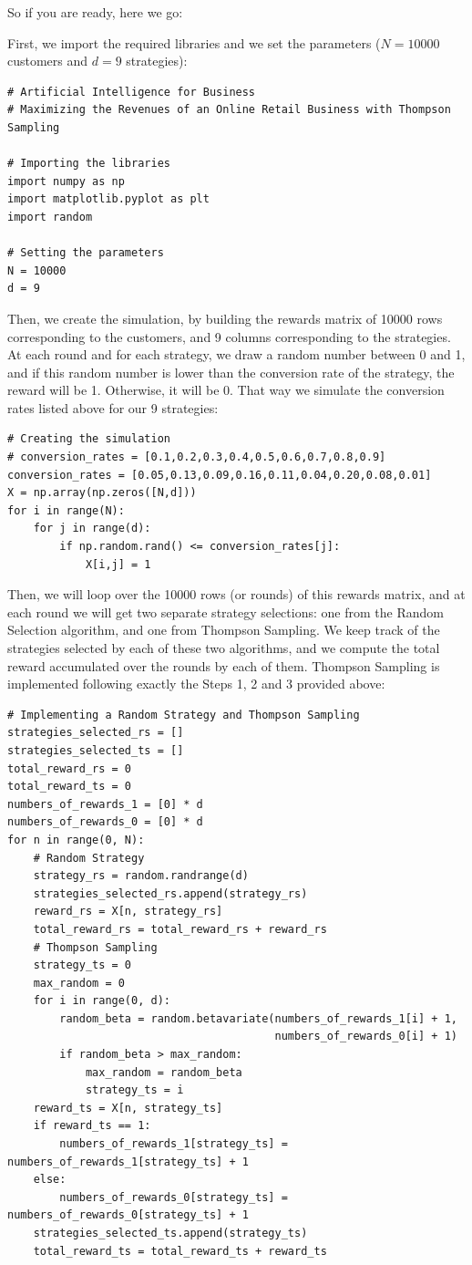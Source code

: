 \documentclass[]{book}
\begin{document}
So if you are ready, here we go:

First, we import the required libraries and we set the parameters (\(N = 10000\) customers and \(d = 9\) strategies):

\begin{lstlisting}
# Artificial Intelligence for Business
# Maximizing the Revenues of an Online Retail Business with Thompson Sampling

# Importing the libraries
import numpy as np
import matplotlib.pyplot as plt
import random

# Setting the parameters
N = 10000
d = 9
\end{lstlisting}

Then, we create the simulation, by building the rewards matrix of 10000 rows corresponding to the customers, and 9 columns corresponding to the strategies. At each round and for each strategy, we draw a random number between 0 and 1, and if this random number is lower than the conversion rate of the strategy, the reward will be 1. Otherwise, it will be 0. That way we simulate the conversion rates listed above for our 9 strategies:

\begin{lstlisting}
# Creating the simulation
# conversion_rates = [0.1,0.2,0.3,0.4,0.5,0.6,0.7,0.8,0.9]
conversion_rates = [0.05,0.13,0.09,0.16,0.11,0.04,0.20,0.08,0.01]
X = np.array(np.zeros([N,d]))
for i in range(N):
    for j in range(d):
        if np.random.rand() <= conversion_rates[j]:
            X[i,j] = 1
\end{lstlisting}

Then, we will loop over the 10000 rows (or rounds) of this rewards matrix, and at each round we will get two separate strategy selections: one from the Random Selection algorithm, and one from Thompson Sampling. We keep track of the strategies selected by each of these two algorithms, and we compute the total reward accumulated over the rounds by each of them. Thompson Sampling is implemented following exactly the Steps 1, 2 and 3 provided above:

\begin{lstlisting}
# Implementing a Random Strategy and Thompson Sampling
strategies_selected_rs = []
strategies_selected_ts = []
total_reward_rs = 0
total_reward_ts = 0
numbers_of_rewards_1 = [0] * d
numbers_of_rewards_0 = [0] * d
for n in range(0, N):
    # Random Strategy
    strategy_rs = random.randrange(d)
    strategies_selected_rs.append(strategy_rs)
    reward_rs = X[n, strategy_rs]
    total_reward_rs = total_reward_rs + reward_rs
    # Thompson Sampling
    strategy_ts = 0
    max_random = 0
    for i in range(0, d):
        random_beta = random.betavariate(numbers_of_rewards_1[i] + 1,
                                         numbers_of_rewards_0[i] + 1)
        if random_beta > max_random:
            max_random = random_beta
            strategy_ts = i
    reward_ts = X[n, strategy_ts]
    if reward_ts == 1:
        numbers_of_rewards_1[strategy_ts] = numbers_of_rewards_1[strategy_ts] + 1
    else:
        numbers_of_rewards_0[strategy_ts] = numbers_of_rewards_0[strategy_ts] + 1
    strategies_selected_ts.append(strategy_ts)
    total_reward_ts = total_reward_ts + reward_ts
\end{lstlisting}
\end{document}
